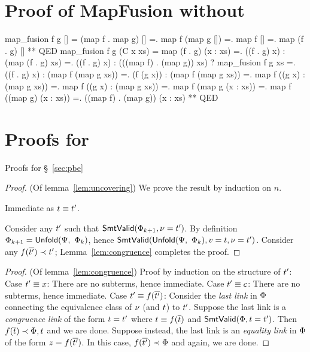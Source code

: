 

\section{Proof of MapFusion without \pbesym} \label{sec:map-fusion-full}

\begin{mcode}
  map_fusion f g []
  =  (map f . map g) []
  =.  map f (map g [])
  =.  map f []
  =.  map (f . g) []
  **  QED
map_fusion f g (C x xs)
  =  map (f . g) (x : xs)
  =. ((f . g) x) : (map (f . g) xs)
  =. ((f . g) x) : (((map f) . (map g)) xs)
     ? map_fusion f g xs
  =. ((f . g) x) : (map f (map g xs))
  =. (f (g x)) : (map f (map g xs))
  =. map f ((g x) : (map g xs))
  =. map f ((g x) : (map g xs))
  =. map f (map g (x : xs))
  =. map f ((map g) (x : xs))
  =. ((map f) . (map g)) (x : xs)
  ** QED
\end{mcode}

\section{Proofs for \pbesym}

Proofs for \S~\ref{sec:pbe}

\begin{proof} (Of lemma~\ref{lem:uncovering})
We prove the result by induction on $n$.

Immediate as $t \equiv t'$.

Consider any $t'$ such that $\mathsf{SmtValid}(\Phi_{k+1}, \nu = t')$.
By definition $\Phi_{k+1} = \mathsf{Unfold}(\Psi,\ \Phi_k)$, hence
$\mathsf{SmtValid}(\mathsf{Unfold}(\Psi,\ \Phi_k), v = t, \nu = t')$.
Consider any $f({\overline{t'}}) \prec t'$;
Lemma~\ref{lem:congruence} completes the proof.
\end{proof}


\begin{proof} (Of lemma~\ref{lem:congruence})
%
Proof by induction on the structure of $t'$:
%
Case $t' \equiv x$:
  There are no subterms, hence immediate.
%
Case $t' \equiv c$:
  There are no subterms, hence immediate.
%
Case $t' \equiv f({\overline{t'}})$:
  Consider the \emph{last link} in $\Phi$
  connecting the equivalence class
  of $\nu$ (and $t$) to $t'$.
  Suppose the last link is a \emph{congruence link}
  of the form $t = t'$ where
  $t \equiv f({\overline{t}})$ and
  $\mathsf{SmtValid}(\Phi, t = t')$.
  Then $f({\overline{t}}) \prec \Phi, t$
  and we are done.
  Suppose instead, the last link is an \emph{equality link}
  in $\Phi$ of the form $z = f({\overline{t'}})$.
  In this case, $f({\overline{t'}}) \prec \Phi$
  and again, we are done.
\end{proof}


